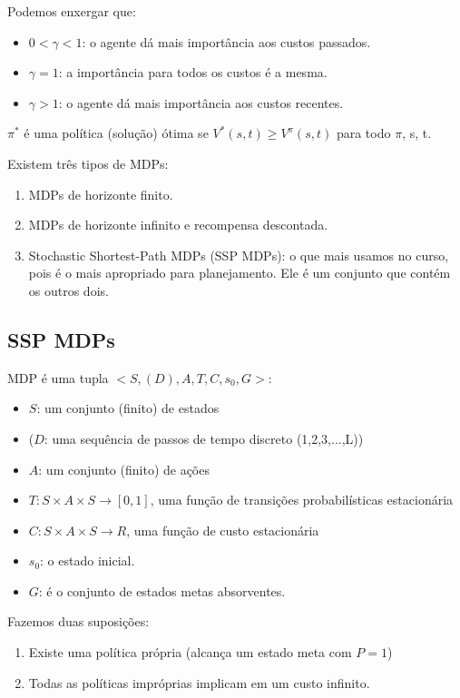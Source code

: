 \documentclass[12pt,letterpaper]{article}
\begin{document}
	Podemos enxergar que:
	
	\begin{itemize}
		\item $0 < \gamma < 1$: o agente dá mais importância aos custos passados.
		\item $\gamma = 1$: a importância para todos os custos é a mesma.
		\item $\gamma > 1$: o agente dá mais importância aos custos recentes.
	\end{itemize}
	
	$\pi^*$ é uma política (solução) ótima se $V^*(s,t) \geq V^\pi(s,t)$ para todo $\pi$, s, t.
	
	Existem três tipos de MDPs:
	
	\begin{enumerate}
		\item MDPs de horizonte finito.
		\item MDPs de horizonte infinito e recompensa descontada.
		\item Stochastic Shortest-Path MDPs (SSP MDPs): o que mais usamos no curso, pois é o mais apropriado para planejamento. Ele é um conjunto que contém os outros dois.
	\end{enumerate}
	
	\subsection*{SSP MDPs}
	
	MDP é uma tupla $<S,(D),A,T,C, s_0, G>$:
	\begin{itemize}
		\item $S$: um conjunto (finito) de estados
		\item ($D$: uma sequência de passos de tempo
		discreto (1,2,3,...,L))
		\item $A$: um conjunto (finito) de ações
		\item $T: S \times A \times S \to [0,1]$, uma função de
		transições probabilísticas estacionária
		\item $C: S \times A \times S \to R$, uma função de custo
		estacionária
		\item $s_0$: o estado inicial.
		\item $G$: é o conjunto de estados metas absorventes.
	\end{itemize}
	
	Fazemos duas suposições:
	
	\begin{enumerate}
		\item Existe uma política própria (alcança um estado meta com $P=1$)
		\item Todas as políticas impróprias implicam em um custo infinito.
	\end{enumerate}
	
\end{document}

